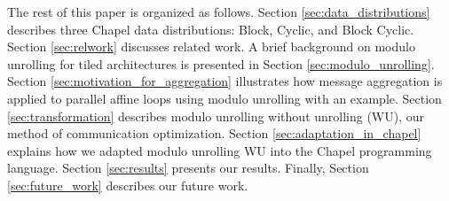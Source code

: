 The rest of this paper is organized as follows. Section \ref{sec:data_distributions} describes three Chapel data distributions: Block, Cyclic, and Block Cyclic. Section \ref{sec:relwork} discusses related work. A brief background on modulo unrolling for tiled architectures \cite{barua1999maps} is presented in Section \ref{sec:modulo_unrolling}. Section \ref{sec:motivation_for_aggregation} illustrates how message aggregation is applied to parallel affine loops using modulo unrolling with an example. Section \ref{sec:transformation} describes modulo unrolling without unrolling (WU), our method of communication optimization. Section \ref{sec:adaptation_in_chapel} explains how we adapted modulo unrolling WU into the Chapel programming language. Section \ref{sec:results} presents our results. Finally, Section \ref{sec:future_work} describes our future work. 